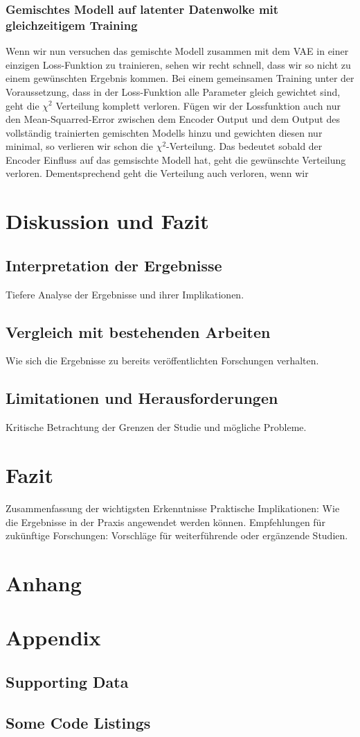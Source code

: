 \documentclass[%
thesis=student,%
coverpage=false,%
titlepage=false,%
headmarks=true, %
german,%
font=libertine, %
math=newpxtx, %
BCOR=5mm,%
coverBCOR=11mm%
]{tumbook}
\theoremstyle{break}
\begin{document}
\subsection{Gemischtes Modell auf latenter Datenwolke mit gleichzeitigem Training}
Wenn wir nun versuchen das gemischte Modell zusammen mit dem VAE in einer einzigen Loss-Funktion zu trainieren, sehen wir recht schnell, dass wir so nicht zu einem gewünschten Ergebnis kommen. Bei einem gemeinsamen Training unter der Voraussetzung, dass in der Loss-Funktion alle Parameter gleich gewichtet sind, geht die $\chi^2$ Verteilung komplett verloren. 
Fügen wir der Lossfunktion auch nur den Mean-Squarred-Error zwischen dem Encoder Output und dem Output des vollständig trainierten gemischten Modells hinzu und gewichten diesen nur minimal, so verlieren wir schon die $\chi^2$-Verteilung. Das bedeutet sobald der Encoder Einfluss auf das gemsischte Modell hat, geht die gewünschte Verteilung verloren.
Dementsprechend geht die Verteilung auch verloren, wenn wir 



\chapter{Diskussion und Fazit}
\section{Interpretation der Ergebnisse}
Tiefere Analyse der Ergebnisse und ihrer Implikationen.
\section{Vergleich mit bestehenden Arbeiten}
Wie sich die Ergebnisse zu bereits veröffentlichten Forschungen verhalten.
\section{Limitationen und Herausforderungen}
Kritische Betrachtung der Grenzen der Studie und mögliche Probleme.
\chapter{Fazit}
Zusammenfassung der wichtigsten Erkenntnisse
Praktische Implikationen: Wie die Ergebnisse in der Praxis angewendet werden können.
Empfehlungen für zukünftige Forschungen: Vorschläge für weiterführende oder ergänzende Studien.
\chapter{Anhang}
\appendix
\chapter{Appendix}
\section{Supporting Data}
\section{Some Code Listings}

\backmatter{}
\listoffigures%
\listoftables%
\printbibliography{} %
\end{document}
